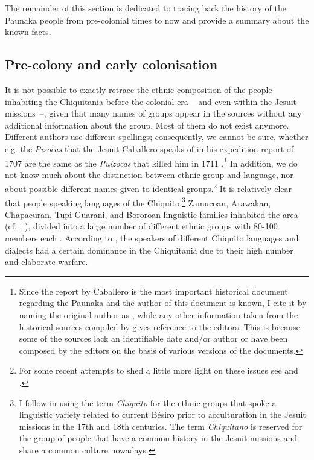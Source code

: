 The remainder of this section is dedicated to tracing back the history of the Paunaka people from pre-colonial times to now and provide a summary about the known facts.

\subsection{Pre-colony and early colonisation}\label{sec:Pre_early_colony}
It is not possible to exactly retrace the ethnic composition of the people inhabiting the Chiquitania before the colonial era – and even within the Jesuit missions~–, given that many names of groups appear in the sources without any additional information about the group. Most of them do not exist anymore. Different authors use different spellings; consequently, we cannot be sure, whether e.g. the \textit{Pisocas} that the Jesuit Caballero speaks of in his expedition report of 1707 \citep[54]{Matienzo_et_al2011} are the same as the \textit{Puizocas} that killed him in 1711 \citep[192]{MatienzoAL2011}.\footnote{Since the report by Caballero is the most important historical document regarding the Paunaka and the author of this document is known, I cite it by naming the original author as \citet[]{Matienzo_et_al2011}, while any other information taken from the historical sources compiled by \citet[]{MatienzoAL2011} gives reference to the editors. This is because some of the sources lack an identifiable date and/or author or have been composed by the editors on the basis of various versions of the documents.} In addition, we do not know much about the distinction between ethnic group and language, nor about possible different names given to identical groups.\footnote{For some recent attempts to shed a little more light on these issues see \citet[]{Nikulin2019} and \citet[]{RamirezFranca2019}.} 
It is relatively clear that people speaking languages of the Chiquito,\footnote{I follow \citet[231]{TomichaCharupa2002} in using the term \textit{Chiquito} for the ethnic groups that spoke a linguistic variety related to current Bésiro prior to acculturation in the Jesuit missions in the 17th and 18th centuries. The term \textit{Chiquitano} is reserved for the group of people that have a common history in the Jesuit missions and share a common culture nowadays.} Zamucoan, Arawakan, Chapacuran, Tupi-Guarani, and Bororoan linguistic families inhabited the area (cf. \citealt[255, 276-277]{TomichaCharupa2002}; \citealt[9]{Tonelli2004}), divided into a large number of different ethnic groups with 80-100 members each \citep[16]{Tonelli2004}. According to \citet[209, 363]{TomichaCharupa2002}, the speakers of different Chi\-qui\-to languages and dialects had a certain dominance in the Chiquitania due to their high number and elaborate warfare.

